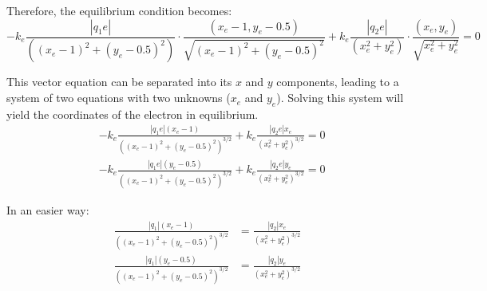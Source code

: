 \begin{ejercicio}
    Therefore, the equilibrium condition becomes:
    \begin{equation*}
        -k_e \frac{|q_1 e|}{((x_e - 1)^2 + (y_e - 0.5)^2)} \cdot \frac{(x_e - 1, y_e - 0.5)}{\sqrt{(x_e - 1)^2 + (y_e - 0.5)^2}} + k_e \frac{|q_2 e|}{(x_e^2 + y_e^2)} \cdot \frac{(x_e, y_e)}{\sqrt{x_e^2 + y_e^2}} = 0
    \end{equation*}

    This vector equation can be separated into its $x$ and $y$ components, leading to a system of two equations with two unknowns ($x_e$ and $y_e$). Solving this system will yield the coordinates of the electron in equilibrium.
    \begin{align*}
        & -k_e \frac{|q_1 e| (x_e - 1)}{((x_e - 1)^2 + (y_e - 0.5)^2)^{3/2}} + k_e \frac{|q_2 e| x_e}{(x_e^2 + y_e^2)^{3/2}} = 0 \\
        & -k_e \frac{|q_1 e| (y_e - 0.5)}{((x_e - 1)^2 + (y_e - 0.5)^2)^{3/2}} + k_e \frac{|q_2 e| y_e}{(x_e^2 + y_e^2)^{3/2}} = 0
    \end{align*}

    In an easier way:
    \begin{align*}
        \frac{|q_1| (x_e - 1)}{((x_e - 1)^2 + (y_e - 0.5)^2)^{3/2}} &= \frac{|q_2| x_e}{(x_e^2 + y_e^2)^{3/2}}\\
        \frac{|q_1| (y_e - 0.5)}{((x_e - 1)^2 + (y_e - 0.5)^2)^{3/2}} &= \frac{|q_2| y_e}{(x_e^2 + y_e^2)^{3/2}}
    \end{align*}

    
\end{ejercicio}


